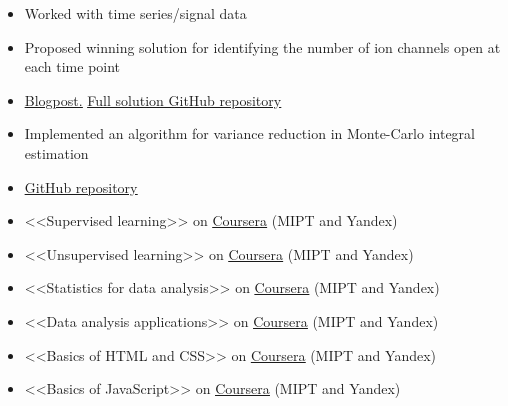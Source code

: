 

\begin{itemize}
	\item Worked with time series/signal data
	\item Proposed winning solution for identifying the number of ion channels open at each time point
	\item \href{https://www.kaggle.com/c/liverpool-ion-switching/discussion/153991}{\underline{Blogpost.}} \href{https://github.com/stdereka/liverpool-ion-switching}{\underline{Full solution GitHub repository}}
\end{itemize}

\divider

\begin{itemize}
	\item Implemented an algorithm for variance reduction in Monte-Carlo integral estimation
	\item \href{https://github.com/stdereka/MAP361P}{\underline{GitHub repository}}
\end{itemize}

\begin{itemize}
	\item <<Supervised learning>> on \href{https://www.coursera.org/learn/supervised-learning?specialization=machine-learning-data-analysis}{\underline{Coursera}} (MIPT and Yandex)
	\item <<Unsupervised learning>> on \href{https://www.coursera.org/learn/unsupervised-learning?specialization=machine-learning-data-analysis}{\underline{Coursera}} (MIPT and Yandex)
	\item <<Statistics for data analysis>> on
	\href{https://www.coursera.org/learn/stats-for-data-analysis/}{\underline{Coursera}} (MIPT and Yandex)
	\item <<Data analysis applications>> on
	\href{https://www.coursera.org/learn/data-analysis-applications}{\underline{Coursera}} (MIPT and Yandex)
	\item <<Basics of HTML and CSS>> on \href{https://www.coursera.org/learn/snovy-html-i-css?specialization=razrabotka-interfeysov}{\underline{Coursera}} (MIPT and Yandex)
	\item <<Basics of JavaScript>> on \href{https://www.coursera.org/learn/javascript-osnovy-i-funktsii}{\underline{Coursera}} (MIPT and Yandex)
\end{itemize}


